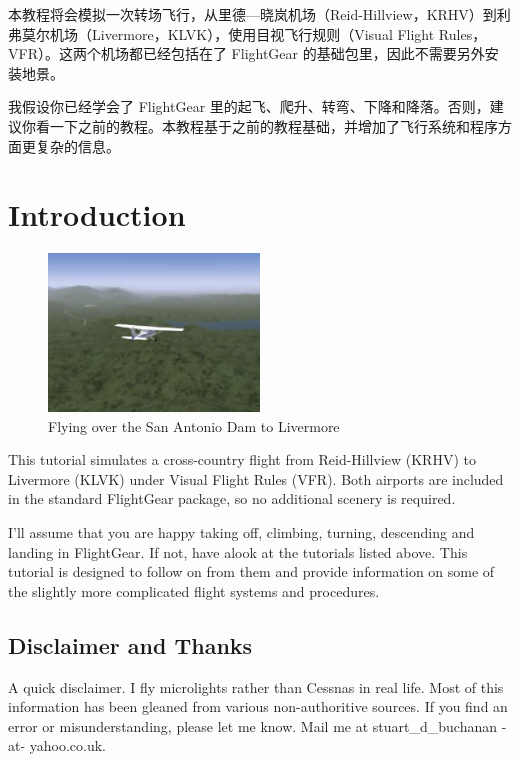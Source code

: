 本教程将会模拟一次转场飞行，从里德—晓岚机场（Reid-Hillview，KRHV）到利弗莫尔机场（Livermore，KLVK），使用目视飞行规则（Visual Flight Rules，VFR）。这两个机场都已经包括在了 FlightGear 的基础包里，因此不需要另外安装地景。

我假设你已经学会了 FlightGear 里的起飞、爬升、转弯、下降和降落。否则，建议你看一下之前的教程。本教程基于之前的教程基础，并增加了飞行系统和程序方面更复杂的信息。

\iffalse
\section{Introduction}

\begin{figure}[!htp]
\centering
\includegraphics[width=0.5\textwidth]{antonio2}
\caption{Flying over the San Antonio Dam to Livermore}
\end{figure}

This tutorial simulates a cross-country flight from Reid-Hillview (KRHV) to
Livermore (KLVK) under Visual Flight Rules (VFR). Both airports are
included in the standard FlightGear package, so no additional scenery is required.

I'll assume that you are happy taking off, climbing, turning, descending
and landing in FlightGear. If not, have alook at the tutorials listed above.
This tutorial is designed to follow on from them and provide information on
some of the slightly more complicated flight systems and procedures.

\subsection{Disclaimer and Thanks}

A quick disclaimer. I fly microlights rather than Cessnas in real life. Most of
this information has been gleaned from various non-authoritive sources. If you
find an error or misunderstanding, please let me know. Mail me at
stuart\_d\_buchanan -at- yahoo.co.uk.

